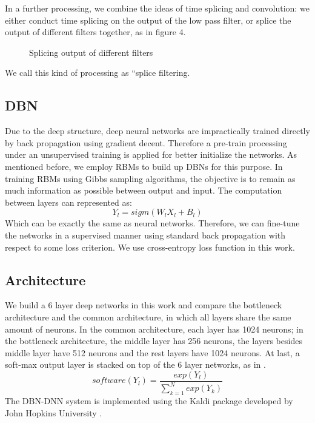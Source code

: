 \documentclass{article}
\begin{document}
In a further processing, we combine the ideas of time splicing and convolution: we either conduct time splicing on the output of the low pass filter, or splice the output of different filters together, as in figure 4.
\begin{figure}
 \centerline{}
 \caption{Splicing output of different filters}
\end{figure}
We call this kind of processing as ``splice filtering. 
 
\subsection{DBN}\label{sec:train}
Due to the deep structure, deep neural networks are impractically trained directly by back propagation using gradient decent. Therefore a pre-train processing under an unsupervised training is applied for better initialize the networks. As mentioned before, we employ RBMs to build up DBNs for this purpose. 
In training RBMs using Gibbs sampling algorithms, the objective is to remain as much information as possible between output and input. The computation between layers can represented as:
 \begin{equation}\label{dbn}
Y_{l} = sigm(W_{l}X_{l} + B_{l})
\end{equation}  
Which can be exactly the same as neural networks. Therefore, we can fine-tune the networks in a supervised manner using standard back propagation with respect to some loss criterion. We use cross-entropy loss function in this work.  

\subsection{Architecture}\label{sec:arch}
We build a 6 layer deep networks in this work and compare the bottleneck architecture and the common architecture, in which all layers share the same amount of neurons. In the common architecture, each layer has 1024 neurons; in the bottleneck architecture, the middle layer has 256 neurons, the layers besides middle layer have 512 neurons and the rest layers have 1024 neurons. At last, a soft-max output layer is stacked on top of the 6 layer networks, as in .
\begin{equation}\label{softmax}
software(Y_{l}) = \frac{exp(Y_{l})}{\sum_{k=1}^N exp(Y_{k})}
\end{equation}
The DBN-DNN system is implemented using the Kaldi package developed by John Hopkins University \cite{povey2011kaldi}.
 
\end{document}
